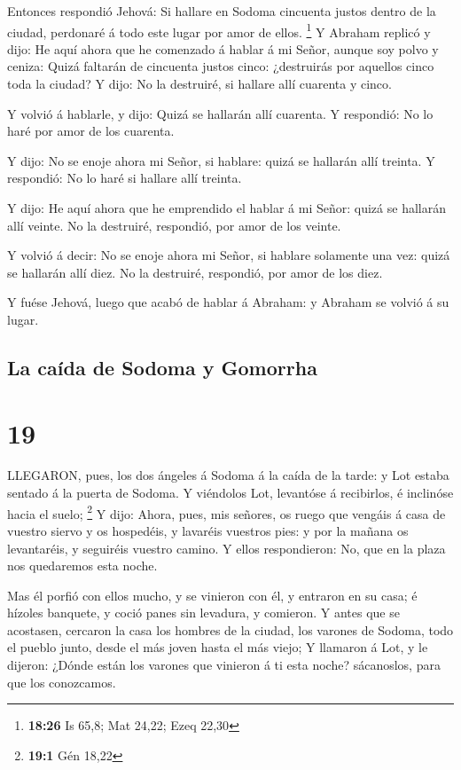  Entonces respondió Jehová: Si hallare en Sodoma cincuenta
justos dentro de la ciudad, perdonaré á todo este lugar por amor de
ellos. \footnote{\textbf{18:26} Is 65,8; Mat 24,22; Ezeq 22,30}
 Y Abraham replicó y dijo: He aquí ahora que he comenzado á
hablar á mi Señor, aunque soy polvo y ceniza:  Quizá
faltarán de cincuenta justos cinco: ¿destruirás por aquellos cinco toda
la ciudad? Y dijo: No la destruiré, si hallare allí cuarenta y cinco.

 Y volvió á hablarle, y dijo: Quizá se hallarán allí
cuarenta. Y respondió: No lo haré por amor de los cuarenta.

 Y dijo: No se enoje ahora mi Señor, si hablare: quizá se
hallarán allí treinta. Y respondió: No lo haré si hallare allí treinta.

 Y dijo: He aquí ahora que he emprendido el hablar á mi
Señor: quizá se hallarán allí veinte. No la destruiré, respondió, por
amor de los veinte.

 Y volvió á decir: No se enoje ahora mi Señor, si hablare
solamente una vez: quizá se hallarán allí diez. No la destruiré,
respondió, por amor de los diez.

 Y fuése Jehová, luego que acabó de hablar á Abraham: y
Abraham se volvió á su lugar.

\hypertarget{la-cauxedda-de-sodoma-y-gomorrha}{%
\subsection{La caída de Sodoma y
Gomorrha}\label{la-cauxedda-de-sodoma-y-gomorrha}}

\hypertarget{section-18}{%
\section{19}\label{section-18}}

 LLEGARON, pues, los dos ángeles á Sodoma á la caída de la
tarde: y Lot estaba sentado á la puerta de Sodoma. Y viéndolos Lot,
levantóse á recibirlos, é inclinóse hacia el suelo; \footnote{\textbf{19:1}
  Gén 18,22}  Y dijo: Ahora, pues, mis señores, os ruego que
vengáis á casa de vuestro siervo y os hospedéis, y lavaréis vuestros
pies: y por la mañana os levantaréis, y seguiréis vuestro camino. Y
ellos respondieron: No, que en la plaza nos quedaremos esta noche.

 Mas él porfió con ellos mucho, y se vinieron con él, y
entraron en su casa; é hízoles banquete, y coció panes sin levadura, y
comieron.  Y antes que se acostasen, cercaron la casa los
hombres de la ciudad, los varones de Sodoma, todo el pueblo junto, desde
el más joven hasta el más viejo;  Y llamaron á Lot, y le
dijeron: ¿Dónde están los varones que vinieron á ti esta noche?
sácanoslos, para que los conozcamos.


